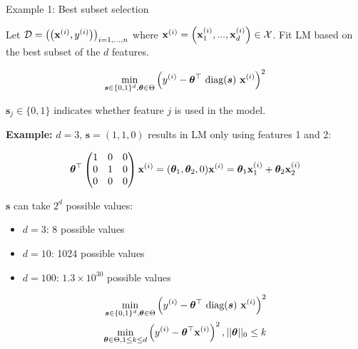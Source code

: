 \documentclass[11pt,compress,t,notes=noshow, xcolor=table]{beamer}
\begin{document}
\begin{vbframe}{Example 1: Best subset selection}

Let $\mathcal{D} = \left(\left(\mathbf{x}^{(i)}, y^{(i)}\right)\right)_{i = 1, ..., n}$ where $\mathbf{x}^{(i)} = \left(\mathbf{x}^{(i)}_1, ..., \mathbf{x}^{(i)}_d\right) \in \mathcal{X}$. Fit LM based on the best subset of the $d$ features. 

\vspace*{-0.5cm}
\begin{eqnarray*}
	\min_{\bm{s} \in \{0, 1\}^d, \bm{\theta} \in \Theta} \left(y^{(i)} - \bm{\theta}^\top ~\text{diag}(\bm{s})~\mathbf{x}^{(i)}\right)^2 \\
\end{eqnarray*}

\vspace*{-0.5cm}

$\bm{s}_j \in \{0, 1\}$ indicates whether feature $j$ is used in the model.

\lz 

\begin{footnotesize}
\textbf{Example:} $d = 3$, $\bm{s} = (1, 1, 0)$ results in LM only using features 1 and 2:

\begin{eqnarray*}
	\bm{\theta}^\top \begin{pmatrix} 1 & 0 & 0 \\
	0 & 1 & 0 \\
	0 & 0 & 0 
	\end{pmatrix} \mathbf{x}^{(i)} = (\bm{\theta}_1, \bm{\theta}_2, 0) \mathbf{x}^{(i)} = \bm{\theta}_1 \mathbf{x}^{(i)}_1 + \bm{\theta}_2 \mathbf{x}^{(i)}_2
\end{eqnarray*}

$\bm{s}$ can take $2^d$ possible values: 

\begin{itemize}
	\item $d = 3$: 8 possible values
	\item $d = 10$: 1024 possible values
	\item $d = 100$: $1.3 \times 10^{30}$ possible values	
\end{itemize}

\end{footnotesize}


\framebreak 

\vspace*{-1cm}

\begin{eqnarray*}
	\min_{\bm{s} \in \{0, 1\}^d, \bm{\theta} \in \Theta} \left(y^{(i)} - \bm{\theta}^\top ~\text{diag}(\bm{s})~\mathbf{x}^{(i)}\right)^2\\
	\min_{\bm{\theta} \in \Theta, 1 \le k \le d} \left(y^{(i)} - \bm{\theta}^\top\mathbf{x}^{(i)}\right)^2, ||\bm{\theta}||_{0} \leq k\\
\end{eqnarray*}


\end{vbframe}
\end{document}
